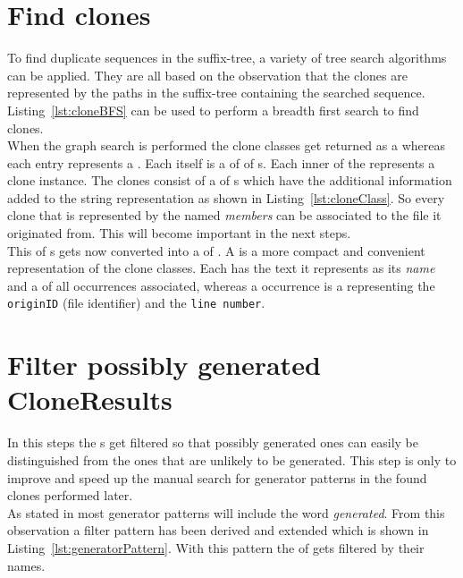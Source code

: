 \section{Find clones}
To find duplicate sequences in the suffix-tree, a variety of tree search algorithms can be applied. They are all based on the observation that the clones are represented by the paths in the suffix-tree containing the searched sequence. Listing~\ref{lst:cloneBFS} can be used to perform a breadth first search to find clones.\\
When the graph search is performed the clone classes get returned as a  whereas each entry represents a . Each  itself is a  of  of s. Each inner  of the  represents a clone instance. The clones consist of a  of s which have the additional information added to the string representation as shown in Listing~\ref{lst:cloneClass}. So every clone that is represented by the  named \textit{members} can be associated to the file it originated from. This will become important in the next steps.\\
This  of s gets now converted into a  of . A  is a more compact and convenient representation of the clone classes. Each has the text it represents as its \textit{name} and a  of all occurrences associated, whereas a occurrence is a  representing the \texttt{originID} (file identifier) and the \texttt{line number}. 




\section{Filter possibly generated CloneResults}
In this steps the s get filtered so that possibly generated ones can easily be distinguished from the ones that are unlikely to be generated. This step is only to improve and speed up the manual search for generator patterns in the found clones performed later.\\
As stated in \cite{Bernwieser2014} most generator patterns will include the word \textit{generated}. From this observation a filter pattern has been derived and extended which is shown in Listing~\ref{lst:generatorPattern}. With this pattern the  of  gets filtered by their names.


